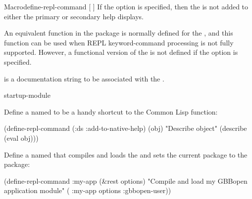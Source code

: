 \documentclass[10pt,twoside,english,pdftex]{article}
\begin{document}
\begin{functiondoc}{Macro}{define-repl-command}{ [\superstar{} \vbar{}
     ] \superstar}
If the  option is specified, then the  is not
added to either the primary or secondary help displays.

An equivalent function in the  package is
normally defined for the  ,
and this function can be used when REPL keyword-command processing is not
fully supported.  However, a  functional
version of the  is not defined if the
 option is specified.

 is a documentation string to be associated
with the  .

\begin{alsos}{startup-module}
\end{alsos}

\fnexamples
Define a  named  to be a handy
shortcut to the Common Lisp  function:
%
\W\supp
\begin{example}
  (define-repl-command (:ds :add-to-native-help) (obj)
    "Describe object"
    (describe (eval obj)))
\end{example}

Define a  named  that compiles and
loads the   and sets the current package to
the  package:
%
\W\supp
\begin{example}
  (define-repl-command :my-app (&rest options)
    "Compile and load my GBBopen application module"
    ( :my-app options :gbbopen-user))
\end{example} 

\end{functiondoc}

\end{document}
